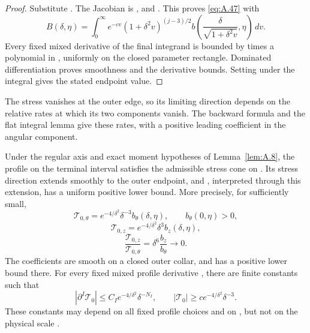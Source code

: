 \begin{proof}
Substitute . The Jacobian is
, and
. This proves \eqref{eq:A.47} with
\[
  B(\delta,\eta)=\int_0^\infty e^{-cv}(1+\delta^2v)^{(j-3)/2}
  b\!\left(\frac{\delta}{\sqrt{1+\delta^2v}},\eta\right)\,dv.
\]
Every fixed mixed derivative of the final integrand is bounded by  times a polynomial in
, uniformly on the closed parameter rectangle. Dominated differentiation proves smoothness and the
derivative bounds. Setting  under the integral gives the stated endpoint value.
\end{proof}

The stress vanishes at the outer edge, so its limiting direction depends on the relative rates at which its two components
vanish. The backward formula and the flat integral lemma give these rates, with a positive leading coefficient in the angular
component.

\begin{proposition}\label{prop:A.10}
Under the regular axis and exact moment hypotheses of Lemma~\ref{lem:A.8}, the profile on the terminal interval satisfies the
admissible stress cone on . Its stress direction extends smoothly to the outer endpoint, and
, interpreted through this extension, has a uniform positive lower bound. More
precisely, for  sufficiently small,
\begin{equation}
  \mathcal T_{0,\theta}=e^{-4/\delta^2}\delta^{-3}b_\theta(\delta,\eta),
  \qquad b_\theta(0,\eta)>0,
  \tag{A.48}\label{eq:A.48}
\end{equation}
\begin{equation}
  \mathcal T_{0,z}=e^{-4/\delta^2}\delta^3b_z(\delta,\eta),
  \tag{A.49}\label{eq:A.49}
\end{equation}
\begin{equation}
  \frac{\mathcal T_{0,z}}{\mathcal T_{0,\theta}}=\delta^6\frac{b_z}{b_\theta}\longrightarrow 0.
  \tag{A.50}\label{eq:A.50}
\end{equation}
The coefficients are smooth on a closed outer collar, and  has a positive lower bound there. For
every fixed mixed profile derivative , there are finite constants
 such that
\begin{equation}
  |\partial^I\mathcal T_0|\leq C_Ie^{-4/\delta^2}\delta^{-N_I},
  \qquad |\mathcal T_0|\geq ce^{-4/\delta^2}\delta^{-3}.
  \tag{A.51}\label{eq:A.51}
\end{equation}
These constants may depend on all fixed profile choices and on , but not on the physical scale
.
\end{proposition}


